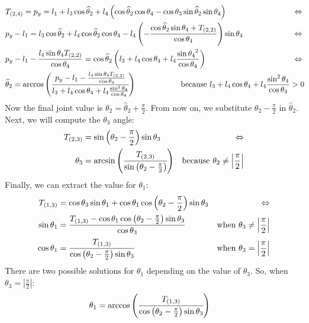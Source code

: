 \begin{align*}
&T_{(2,4)} = p_y = l_1 + l_3\cos\widehat{\theta}_2 + l_4\left(\cos\widehat{\theta}_2\cos\theta_4 - \cos\theta_3\sin\widehat{\theta}_2\sin\theta_4\right)&\Leftrightarrow\\
&p_y - l_1 =l_3\cos\widehat{\theta}_2 + l_4\cos\widehat{\theta}_2\cos\theta_4 - l_4\left(-\frac{\cos\widehat{\theta}_2\sin\theta_4 + T_{(2,2)}}{\cos\theta_4}\right)\sin\theta_4&\Leftrightarrow\\
&p_y - l_1 - \frac{l_4\sin\theta_4 T_{(2,2)}}{\cos\theta_4} = \cos\widehat{\theta}_2\left(l_3 + l_4\cos\theta_4 + l_4\frac{{\sin\theta_4}^2}{\cos\theta_4}\right)&\Leftrightarrow\\
&\widehat{\theta}_2 = \arccos\left(\cfrac{p_y - l_1 - \frac{l_4\sin\theta_4 T_{(2,2)}}{\cos\theta_4}}{l_3 + l_4\cos\theta_4 + l_4\frac{\sin^2\theta_4}{\cos\theta_4}}\right) \hspace{2cm} \text{because }   l_3 + l_4\cos\theta_4 + l_4\frac{\sin^2\theta_4}{\cos\theta_4}>0 \hspace{-0.8cm}
\end{align*}
Now the final joint value is $\theta_2 = \widehat{\theta}_2 + \frac{\pi}{2}$. From now on, we substitute $\theta_2 - \frac{\pi}{2}$ in $\widehat{\theta}_2$.
Next, we will compute the $\theta_3$ angle:
\begin{align*}
T_{(2,3)} &= \sin\left(\theta_2 - \frac{\pi}{2}\right)\sin\theta_3 &\Leftrightarrow \\
 \theta_3 &= \arcsin\left( \cfrac{ T_{(2,3)} }{ \sin\left(\theta_2-\frac{\pi}{2}\right)}\right)  &\text{because }    \theta_2 \neq \left|\frac{\pi}{2}\right|
\end{align*}
Finally, we can extract the value for $\theta_1$:
\begin{align*}
T_{(1,3)} &= \cos\theta_3\sin\theta_1 + \cos\theta_1\cos\left(\theta_2 - \frac{\pi}{2}\right)\sin\theta_3 &\Leftrightarrow \\
\sin\theta_1 &= \cfrac{T_{(1,3)} - \cos\theta_1\cos\left(\theta_2 - \frac{\pi}{2}\right)\sin\theta_3}{\cos\theta_3}  &\text{when } \theta_3 \neq \left|\frac{\pi}{2}\right|\\
\cos\theta_1 &= \cfrac{T_{(1,3)}}{\cos\left(\theta_2 - \frac{\pi}{2}\right)\sin\theta_3}  &\text{when } \theta_3 = \left|\frac{\pi}{2}\right|
\end{align*}
There are two possible solutions for $\theta_1$ depending on the value of $\theta_3$. So, when $\theta_3 = \left|\frac{\pi}{2}\right|$:
\begin{align*}
&\theta_1 = \arccos\left(\cfrac{T_{(1,3)}}{\cos\left(\theta_2 - \frac{\pi}{2}\right)\sin\theta_3}\right)
\end{align*}
